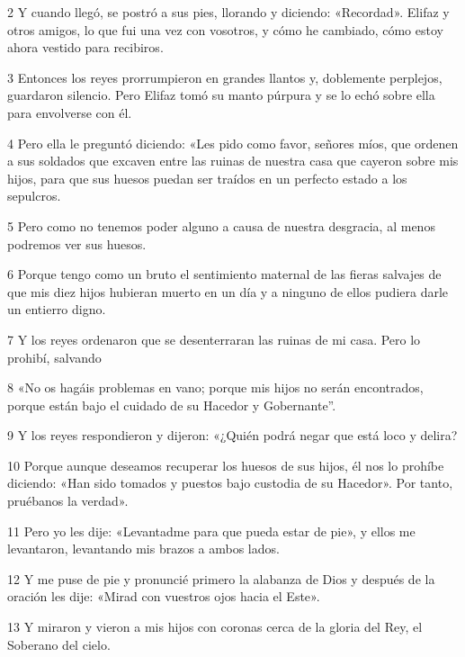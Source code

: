 \par 2 Y cuando llegó, se postró a sus pies, llorando y diciendo: «Recordad». Elifaz y otros amigos, lo que fui una vez con vosotros, y cómo he cambiado, cómo estoy ahora vestido para recibiros.

\par 3 Entonces los reyes prorrumpieron en grandes llantos y, doblemente perplejos, guardaron silencio. Pero Elifaz tomó su manto púrpura y se lo echó sobre ella para envolverse con él.

\par 4 Pero ella le preguntó diciendo: «Les pido como favor, señores míos, que ordenen a sus soldados que excaven entre las ruinas de nuestra casa que cayeron sobre mis hijos, para que sus huesos puedan ser traídos en un perfecto estado a los sepulcros.

\par 5 Pero como no tenemos poder alguno a causa de nuestra desgracia, al menos podremos ver sus huesos.

\par 6 Porque tengo como un bruto el sentimiento maternal de las fieras salvajes de que mis diez hijos hubieran muerto en un día y a ninguno de ellos pudiera darle un entierro digno.

\par 7 Y los reyes ordenaron que se desenterraran las ruinas de mi casa. Pero lo prohibí, salvando

\par 8 «No os hagáis problemas en vano; porque mis hijos no serán encontrados, porque están bajo el cuidado de su Hacedor y Gobernante''.

\par 9 Y los reyes respondieron y dijeron: «¿Quién podrá negar que está loco y delira?

\par 10 Porque aunque deseamos recuperar los huesos de sus hijos, él nos lo prohíbe diciendo: «Han sido tomados y puestos bajo custodia de su Hacedor». Por tanto, pruébanos la verdad».

\par 11 Pero yo les dije: «Levantadme para que pueda estar de pie», y ellos me levantaron, levantando mis brazos a ambos lados.

\par 12 Y me puse de pie y pronuncié primero la alabanza de Dios y después de la oración les dije: «Mirad con vuestros ojos hacia el Este».

\par 13 Y miraron y vieron a mis hijos con coronas cerca de la gloria del Rey, el Soberano del cielo.


